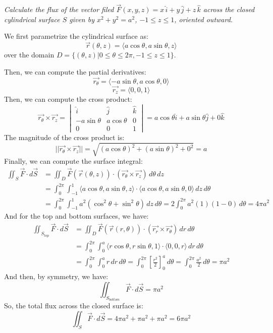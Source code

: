 \documentclass[11pt]{report}
\begin{document}
\begin{example}
    \textit{Calculate the flux of the vector filed $\vec{F}(x,y,z) = x \, \hat{i} + y \, \hat{j} + z \, \hat{k}$ across the closed cylindrical surface \(S\) given by \(x^2 + y^2 = a^2\), \(-1 \leq z \leq 1\), oriented outward.}

    We first parametrize the cylindrical surface as:
    $$        \vec{r}(\theta, z) = \langle a \cos \theta, a \sin \theta, z \rangle $$
    over the domain \(D = \{(\theta, z) | 0 \leq \theta \leq 2\pi, -1 \leq z \leq 1\}\).

    Then, we can compute the partial derivatives:
    $$        \vec{r_\theta} = \langle -a \sin \theta, a \cos \theta, 0 \rangle $$
    $$        \vec{r_z} = \langle 0, 0, 1 \rangle $$
    Then, we can compute the cross product:
    $$        \vec{r_\theta} \times \vec{r_z} = 
        \begin{vmatrix}
            \hat{i} & \hat{j} & \hat{k} \\ 
            -a \sin \theta & a \cos \theta & 0 \\ 
            0 & 0 & 1
        \end{vmatrix}
        = a \cos \theta \hat{i} + a \sin \theta \hat{j} + 0 \hat{k}
    $$
    The magnitude of the cross product is:
    $$        ||\vec{r_\theta} \times \vec{r_z}|| = \sqrt{(a \cos \theta)^2 + (a \sin \theta)^2 + 0^2} = a $$
    Finally, we can compute the surface integral:
    \begin{align*}
        \iint_S \vec{F} \cdot d\vec{S} &= \iint_D \vec{F}(\vec{r}(\theta, z)) \cdot (\vec{r_\theta} \times \vec{r_z}) \, d\theta \, dz \\
        &= \int_0^{2\pi} \int_{-1}^1 \langle a \cos \theta, a \sin \theta, z \rangle \cdot \langle a \cos \theta, a \sin \theta, 0 \rangle \, dz \, d\theta \\
        &= \int_0^{2\pi} \int_{-1}^1 a^2 (\cos^2 \theta + \sin^2 \theta) \, dz \, d\theta = 2\int_0^{2\pi} a^2 (1) (1 - 0) \, d\theta = 4\pi a^2
    \end{align*}
    And for the top and bottom surfaces, we have:
    \begin{align*}
        \iint_{S_{top}} \vec{F} \cdot d\vec{S} &= \iint_D \vec{F}(\vec{r}(r, \theta)) \cdot (\vec{r_r} \times \vec{r_\theta}) \, dr \, d\theta \\
        &= \int_0^{2\pi} \int_0^a \langle r \cos \theta, r \sin \theta, 1 \rangle \cdot \langle 0, 0, r \rangle \, dr \, d\theta \\
        &= \int_0^{2\pi} \int_0^a r \, dr \, d\theta = \int_0^{2\pi} \left[ \frac{r^2}{2} \right]_0^a \, d\theta = \int_0^{2\pi} \frac{a^2}{2} \, d\theta = \pi a^2
    \end{align*}
    And then, by symmetry, we have:
    $$        \iint_{S_{bottom}} \vec{F} \cdot d\vec{S} = \pi a^2 $$
    So, the total flux across the closed surface is:
    $$        \iint_S \vec{F} \cdot d\vec{S} = 4\pi a^2 + \pi a^2 + \pi a^2 = 6\pi a^2 $$
\end{example}
\end{document}
